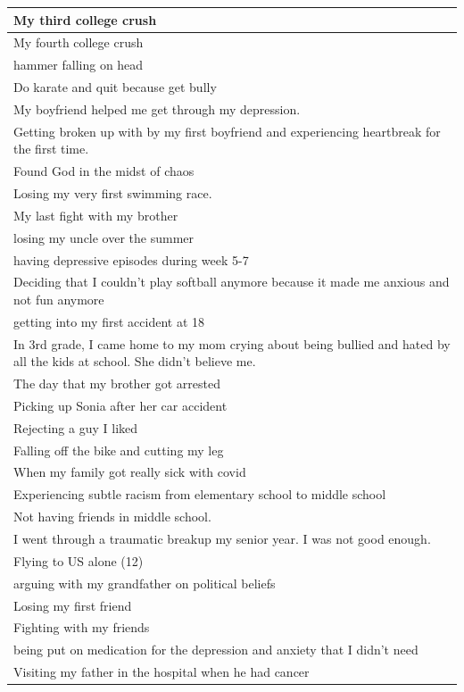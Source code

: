 \documentclass[
  .7em,
  letterpaper,
  DIV=11,
  numbers=noendperiod]{scrartcl}
\begin{document}
\begin{table}
\begin{tabular}{l}
\hline
My third college crush\\
\hline
My fourth college crush\\
\hline
hammer falling on head\\
\hline
Do karate and quit because get bully\\
\hline
My boyfriend helped me get through my depression.\\
\hline
Getting broken up with by my first boyfriend and experiencing heartbreak for the first time.\\
\hline
Found God in the midst of chaos\\
\hline
Losing my very first swimming race.\\
\hline
My last fight with my brother\\
\hline
losing my uncle over the summer\\
\hline
having depressive episodes during week 5-7\\
\hline
Deciding that I couldn't play softball anymore because it made me anxious and not fun anymore\\
\hline
getting into my first accident at 18\\
\hline
In 3rd grade, I came home to my mom crying about being bullied and hated by all the kids at school. She didn't believe me.\\
\hline
The day that my brother got arrested\\
\hline
Picking up Sonia after her car accident\\
\hline
Rejecting a guy I liked\\
\hline
Falling off the bike and cutting my leg\\
\hline
When my family got really sick with covid\\
\hline
Experiencing subtle racism from elementary school to middle school\\
\hline
Not having friends in middle school.\\
\hline
I went through a traumatic breakup my senior year. I was not good enough.\\
\hline
Flying to US alone (12)\\
\hline
arguing with my grandfather on political beliefs\\
\hline
Losing my first friend\\
\hline
Fighting with my friends\\
\hline
being put on medication for the depression and anxiety that I didn't need\\
\hline
Visiting my father in the hospital when he had cancer\\

\end{tabular}
\end{table}
\end{document}
